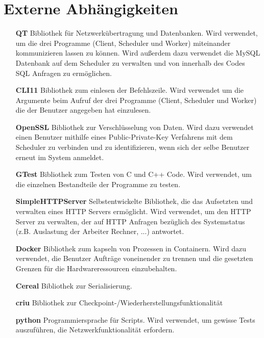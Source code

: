 \documentclass[a4paper,12pt]{article}
\begin{document}
\section{Externe Abhängigkeiten}
\begin{itemize}
	\item [\textbf{QT}] \hspace{10mm} Bibliothek für Netzwerkübertragung und Datenbanken. Wird verwendet, um die drei Programme (Client, Scheduler und Worker) miteinander kommunizieren lassen zu können. Wird außerdem dazu verwendet die MySQL Datenbank auf dem Scheduler zu verwalten und von innerhalb des Codes SQL Anfragen zu ermöglichen.

	\item [\textbf{CLI11}]\hspace{10mm} Bibliothek zum einlesen der Befehlszeile. Wird verwendet um die Argumente beim Aufruf der drei Programme (Client, Scheduler und Worker) die der Benutzer angegeben hat einzulesen.

	\item [\textbf{OpenSSL}] \hspace{10mm} Bibliothek zur Verschlüsselung von Daten. Wird dazu verwendet einen Benutzer mithilfe eines Public-Private-Key Verfahrens mit dem Scheduler zu verbinden und zu identifizieren, wenn sich der selbe Benutzer erneut im System anmeldet.

	\item [\textbf{GTest}] \hspace{0.5cm} Bibliothek zum Testen von C und C++ Code. Wird verwendet, um die einzelnen Bestandteile der Programme zu testen.

	\item [\textbf{SimpleHTTPServer}] \hspace{3cm} Selbstentwickelte Bibliothek, die das Aufsetzten und verwalten eines HTTP Servers ermöglicht. Wird verwendet, um den HTTP Server zu verwalten, der auf HTTP Anfragen bezüglich des Systemstatus (z.B. Auslastung der Arbeiter Rechner, ...) antwortet.

	\item [\textbf{Docker}]\hspace{10mm} Bibliothek zum kapseln von Prozessen in Containern. Wird dazu verwendet, die Benutzer Aufträge voneinender zu trennen und die gesetzten Grenzen für die Hardwareressourcen einzubehalten.

	\item [\textbf{Cereal}]\hspace{1cm} Bibliothek zur Serialisierung.

	\item [\textbf{criu}] \hspace{1cm}Bibliothek zur Checkpoint-/Wiederherstellungsfunktionalität 

	\item [\textbf{python}]\hspace{1cm} Programmiersprache für Scripts. Wird verwendet, um gewisse Tests auszuführen, die Netzwerkfunktionalität erfordern.

\end{itemize}
\end{document}
